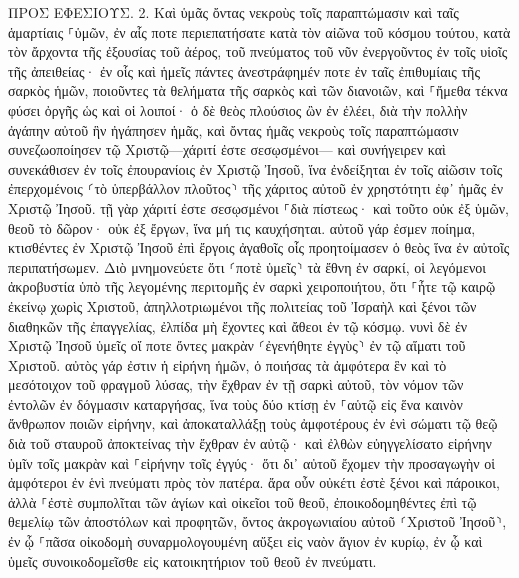\documentclass[twoside, 9pt]{extreport}
\begin{document}
ΠΡΟΣ ΕΦΕΣΙΟΥΣ.
2.
Καὶ ὑμᾶς ὄντας νεκροὺς τοῖς παραπτώμασιν καὶ ταῖς ἁμαρτίαις ⸀ὑμῶν, 
ἐν αἷς ποτε περιεπατήσατε κατὰ τὸν αἰῶνα τοῦ κόσμου τούτου, κατὰ τὸν ἄρχοντα τῆς ἐξουσίας τοῦ ἀέρος, τοῦ πνεύματος τοῦ νῦν ἐνεργοῦντος ἐν τοῖς υἱοῖς τῆς ἀπειθείας· 
ἐν οἷς καὶ ἡμεῖς πάντες ἀνεστράφημέν ποτε ἐν ταῖς ἐπιθυμίαις τῆς σαρκὸς ἡμῶν, ποιοῦντες τὰ θελήματα τῆς σαρκὸς καὶ τῶν διανοιῶν, καὶ ⸀ἤμεθα τέκνα φύσει ὀργῆς ὡς καὶ οἱ λοιποί· 
ὁ δὲ θεὸς πλούσιος ὢν ἐν ἐλέει, διὰ τὴν πολλὴν ἀγάπην αὐτοῦ ἣν ἠγάπησεν ἡμᾶς, 
καὶ ὄντας ἡμᾶς νεκροὺς τοῖς παραπτώμασιν συνεζωοποίησεν τῷ Χριστῷ—χάριτί ἐστε σεσῳσμένοι— 
καὶ συνήγειρεν καὶ συνεκάθισεν ἐν τοῖς ἐπουρανίοις ἐν Χριστῷ Ἰησοῦ, 
ἵνα ἐνδείξηται ἐν τοῖς αἰῶσιν τοῖς ἐπερχομένοις ⸂τὸ ὑπερβάλλον πλοῦτος⸃ τῆς χάριτος αὐτοῦ ἐν χρηστότητι ἐφ᾽ ἡμᾶς ἐν Χριστῷ Ἰησοῦ. 
τῇ γὰρ χάριτί ἐστε σεσῳσμένοι ⸀διὰ πίστεως· καὶ τοῦτο οὐκ ἐξ ὑμῶν, θεοῦ τὸ δῶρον· 
οὐκ ἐξ ἔργων, ἵνα μή τις καυχήσηται. 
αὐτοῦ γάρ ἐσμεν ποίημα, κτισθέντες ἐν Χριστῷ Ἰησοῦ ἐπὶ ἔργοις ἀγαθοῖς οἷς προητοίμασεν ὁ θεὸς ἵνα ἐν αὐτοῖς περιπατήσωμεν. 
Διὸ μνημονεύετε ὅτι ⸂ποτὲ ὑμεῖς⸃ τὰ ἔθνη ἐν σαρκί, οἱ λεγόμενοι ἀκροβυστία ὑπὸ τῆς λεγομένης περιτομῆς ἐν σαρκὶ χειροποιήτου, 
ὅτι ⸀ἦτε τῷ καιρῷ ἐκείνῳ χωρὶς Χριστοῦ, ἀπηλλοτριωμένοι τῆς πολιτείας τοῦ Ἰσραὴλ καὶ ξένοι τῶν διαθηκῶν τῆς ἐπαγγελίας, ἐλπίδα μὴ ἔχοντες καὶ ἄθεοι ἐν τῷ κόσμῳ. 
νυνὶ δὲ ἐν Χριστῷ Ἰησοῦ ὑμεῖς οἵ ποτε ὄντες μακρὰν ⸂ἐγενήθητε ἐγγὺς⸃ ἐν τῷ αἵματι τοῦ Χριστοῦ. 
αὐτὸς γάρ ἐστιν ἡ εἰρήνη ἡμῶν, ὁ ποιήσας τὰ ἀμφότερα ἓν καὶ τὸ μεσότοιχον τοῦ φραγμοῦ λύσας, τὴν ἔχθραν ἐν τῇ σαρκὶ αὐτοῦ, 
τὸν νόμον τῶν ἐντολῶν ἐν δόγμασιν καταργήσας, ἵνα τοὺς δύο κτίσῃ ἐν ⸀αὑτῷ εἰς ἕνα καινὸν ἄνθρωπον ποιῶν εἰρήνην, 
καὶ ἀποκαταλλάξῃ τοὺς ἀμφοτέρους ἐν ἑνὶ σώματι τῷ θεῷ διὰ τοῦ σταυροῦ ἀποκτείνας τὴν ἔχθραν ἐν αὐτῷ· 
καὶ ἐλθὼν εὐηγγελίσατο εἰρήνην ὑμῖν τοῖς μακρὰν καὶ ⸀εἰρήνην τοῖς ἐγγύς· 
ὅτι δι᾽ αὐτοῦ ἔχομεν τὴν προσαγωγὴν οἱ ἀμφότεροι ἐν ἑνὶ πνεύματι πρὸς τὸν πατέρα. 
ἄρα οὖν οὐκέτι ἐστὲ ξένοι καὶ πάροικοι, ἀλλὰ ⸀ἐστὲ συμπολῖται τῶν ἁγίων καὶ οἰκεῖοι τοῦ θεοῦ, 
ἐποικοδομηθέντες ἐπὶ τῷ θεμελίῳ τῶν ἀποστόλων καὶ προφητῶν, ὄντος ἀκρογωνιαίου αὐτοῦ ⸂Χριστοῦ Ἰησοῦ⸃, 
ἐν ᾧ ⸀πᾶσα οἰκοδομὴ συναρμολογουμένη αὔξει εἰς ναὸν ἅγιον ἐν κυρίῳ, 
ἐν ᾧ καὶ ὑμεῖς συνοικοδομεῖσθε εἰς κατοικητήριον τοῦ θεοῦ ἐν πνεύματι. 
\end{document}
